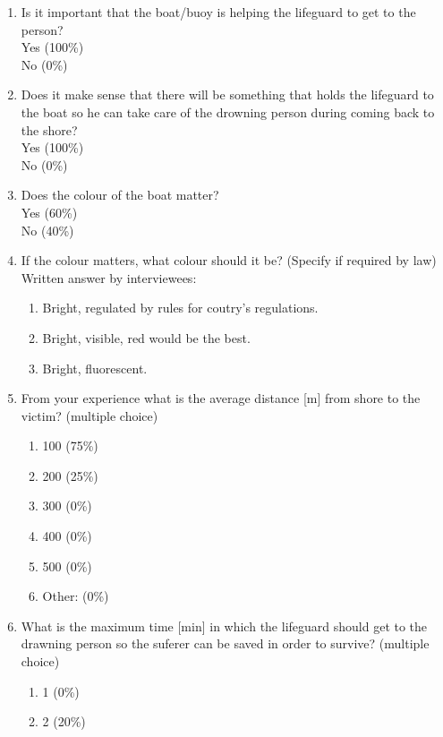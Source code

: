 \begin{enumerate}
\begin{enumerate}
    \end{enumerate}
    \item Is it important that the boat/buoy is helping the lifeguard to get to the person?\\
                Yes (100\%)\\
                No (0\%)
    \item Does it make sense that there will be something that holds the lifeguard to the boat so he can take care of the drowning person during coming back to the shore?\\
                Yes (100\%)\\
                No (0\%)
    \item Does the colour of the boat matter?\\
                Yes (60\%)\\
                No (40\%)
    \item If the colour matters, what colour should it be? (Specify if required by law)\\
            Written answer by interviewees:
            \begin{enumerate}
                \item Bright, regulated by rules for coutry's regulations.
                \item Bright, visible, red would be the best.
                \item Bright, fluorescent.
            \end{enumerate} 
            \newpage
    \item From your experience what is the average distance [m] from shore to the victim? (multiple choice) 
    \begin{enumerate}    
        \item  100 (75\%)
        \item  200 (25\%)
        \item  300 (0\%)
        \item  400 (0\%)
        \item  500 (0\%)
        \item  Other: (0\%)
        \end{enumerate}
    \item What is the maximum time [min] in which the lifeguard should get to the drawning person so the suferer can be saved in order to survive? (multiple choice)
    \begin{enumerate}        
        \item   1 (0\%)
        \item   2 (20\%)

\end{enumerate}
\end{enumerate}
